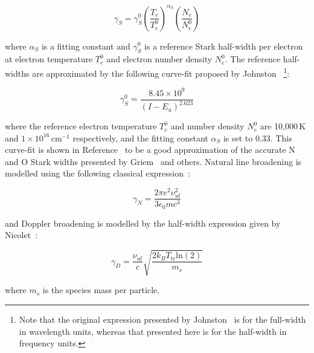 \begin{equation}
 \gamma_S =  \gamma_{S}^{0} \left ( \frac{T_e}{T_e^0} \right )^{\alpha_S} \left ( \frac{N_e}{N_e^0} \right )
 \label{eq:stark}
\end{equation}

\noindent where $\alpha_S$ is a fitting constant and $\gamma_{S}^{0}$ is a reference Stark half-width per electron at electron temperature $T_e^0$ and electron number density $N_e^0$.
The reference half-widths are approximated by the following curve-fit proposed by Johnston ~\cite{JohnPhd}\footnote{Note that the original expression presented by Johnston~\cite{JohnPhd} is for the full-width in wavelength units, whereas that presented here is for the half-width in frequency units.}:

\begin{equation}
 \gamma_S^0 = \frac{8.45 \times 10^{9}}{ \left ( I - E_u \right )^{2.623}}
\end{equation}

\noindent where the reference electron temperature $T_e^0$ and number density $N_e^0$ are 10,000\,K and $1 \times 10^{16}$\,cm$^{-1}$ respectively, and the fitting constant $\alpha_S$ is set to 0.33.
 This curve-fit is shown in Reference~\cite{JohnPhd} to be a good approximation of the accurate N and O Stark widths presented by Griem~\cite{Griem64} and others.
Natural line broadening is modelled using the following classical expression~\cite{Thorne74}:

\begin{equation}
 \gamma_N = \frac{2 \pi e^2 \nu_{ul}^2 }{3 \epsilon_0 m c^3}
\end{equation}

\noindent and Doppler broadening is modelled by the half-width expression given by Nicolet~\cite{Nic70}:

\begin{equation}
 \gamma_D = \frac{\nu_{ul}}{c} \sqrt{ \frac{2 k_B T_\text{tr} \text{ln}(2)}{m_s} }
\end{equation}

\noindent where $m_s$ is the species mass per particle.

\par

